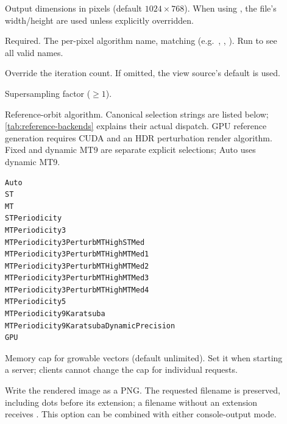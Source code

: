 \begin{description}
  \item[]
    Output dimensions in pixels (default $1024\times768$).  When using
    , the file's width/height are used unless
    explicitly overridden.

  \item[]
    Required.  The per-pixel algorithm name, matching
     (e.g.\
    , ,
    ).  Run  to see all
    valid names.

  \item[]
    Override the iteration count.  If omitted, the view source's
    default is used.

  \item[]
    Supersampling factor ($\ge 1$).

  \item[]
    Reference-orbit algorithm. Canonical selection strings are listed below;
    \cref{tab:reference-backends} explains their actual dispatch.
    GPU reference generation requires CUDA and an HDR perturbation render algorithm.
    Fixed and dynamic MT9 are separate explicit selections; Auto uses dynamic MT9.
\par\noindent
\begin{minipage}{\linewidth}
\begin{lstlisting}[language={}]
Auto
ST
MT
STPeriodicity
MTPeriodicity3
MTPeriodicity3PerturbMTHighSTMed
MTPeriodicity3PerturbMTHighMTMed1
MTPeriodicity3PerturbMTHighMTMed2
MTPeriodicity3PerturbMTHighMTMed3
MTPeriodicity3PerturbMTHighMTMed4
MTPeriodicity5
MTPeriodicity9Karatsuba
MTPeriodicity9KaratsubaDynamicPrecision
GPU
\end{lstlisting}
\end{minipage}
\par

  \item[]
    Memory cap for growable vectors (default unlimited). Set it when starting
    a server; clients cannot change the cap for individual requests.

  \item[]
    Write the rendered image as a PNG. The requested filename is preserved,
    including dots before its extension; a filename without an extension receives
    \code{.png}. This option can be combined with either console-output mode.


\end{description}
